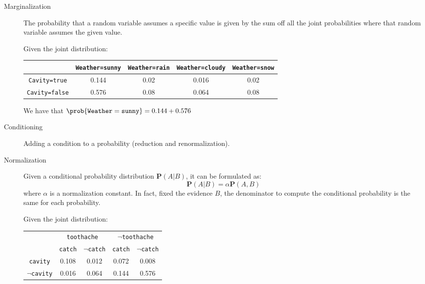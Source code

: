 \begin{description}
    \item[Marginalization] 
        The probability that a random variable assumes a specific value is given by 
        the sum off all the joint probabilities where that random variable assumes the given value.
        \begin{example}
            Given the joint distribution:
            \begin{center}
                \small
                \begin{tabular}{|c | c|c|c|c|}
                    \cline{2-5}
                    \multicolumn{1}{c|}{}    & \texttt{Weather=sunny} & \texttt{Weather=rain} & \texttt{Weather=cloudy} & \texttt{Weather=snow} \\
                    \hline
                    \texttt{Cavity=true}    & 0.144 & 0.02 & 0.016 & 0.02 \\
                    \hline
                    \texttt{Cavity=false}   & 0.576 & 0.08 & 0.064 & 0.08 \\
                    \hline
                \end{tabular}
            \end{center}
            We have that $\prob{\texttt{Weather}=\texttt{sunny}} = 0.144 + 0.576$
        \end{example}
    \item[Conditioning] 
        Adding a condition to a probability (reduction and renormalization).

    \item[Normalization] 
        Given a conditional probability distribution $\textbf{P}(A \vert B)$,
        it can be formulated as:
        \[ \textbf{P}(A \vert B) = \alpha\textbf{P}(A, B) \]
        where $\alpha$ is a normalization constant.
        In fact, fixed the evidence $B$, the denominator to compute the conditional probability is the same for each probability.

        \begin{example}
            Given the joint distribution:
            \begin{center}
                \begin{tabular}{|c|c|c|c|c|}
                    \cline{2-5}
                    \multicolumn{1}{c|}{}    & \multicolumn{2}{c|}{\texttt{toothache}} & \multicolumn{2}{c|}{$\lnot$\texttt{toothache}} \\
                    \cline{2-5}
                    \multicolumn{1}{c|}{}    & \texttt{catch} & $\lnot$\texttt{catch} & \texttt{catch} & $\lnot$\texttt{catch} \\
                    \hline
                    \texttt{cavity}         & 0.108 & 0.012 & 0.072 & 0.008 \\
                    \hline
                    $\lnot$\texttt{cavity}  & 0.016 & 0.064 & 0.144 & 0.576 \\
                    \hline
                \end{tabular}
            \end{center}


\end{example}
\end{description}
